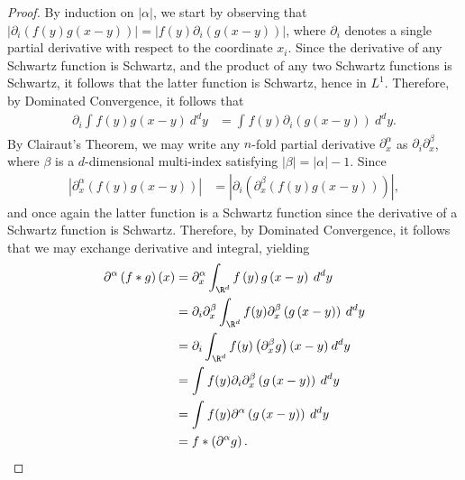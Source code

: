 \documentclass[10pt]{mypackage}
\begin{document}
\begin{proof}
  By induction on $\left\vert \alpha \right\vert$, we start by observing that $\left\vert \partial_{i}\left( f(y)g\left( x-y \right) \right) \right\vert = \left\vert f(y)\partial_{i}\left( g\left( x-y \right) \right) \right\vert$, where $\partial_i$ denotes a single partial derivative with respect to the coordinate $x_i$. Since the derivative of any Schwartz function is Schwartz, and the product of any two Schwartz functions is Schwartz, it follows that the latter function is Schwartz, hence in $L^1$. Therefore, by Dominated Convergence, it follows that
  \begin{align*}
    \partial_{i} \int_{}^{} f\left( y \right)g\left( x-y \right)\:d^{d}y &= \int_{}^{} f(y)\partial_{i}\left( g\left( x-y \right) \right)\:d^{d}y.
  \end{align*}
  By Clairaut's Theorem, we may write any $n$-fold partial derivative $\partial^{\alpha}_x$ as $\partial_{i}\partial^{\beta}_x$, where $\beta$ is a $d$-dimensional multi-index satisfying $\left\vert \beta \right\vert = \left\vert \alpha \right\vert-1$. Since
  \begin{align*}
    \left\vert \partial^{\alpha}_x\left( f(y)g\left( x-y \right) \right) \right\vert &= \left\vert \partial_i\left( \partial^{\beta}_x\left( f(y)g\left( x-y \right) \right) \right) \right\vert,
  \end{align*}
  and once again the latter function is a Schwartz function since the derivative of a Schwartz function is Schwartz. Therefore, by Dominated Convergence, it follows that we may exchange derivative and integral, yielding
  \begin{align*}
    \partial^{\alpha}\left( f\ast g \right)\left( x \right) &= \partial^{\alpha}_{x} \int_{\R^d}^{} f\left( y \right)g\left( x-y \right)\:d^{d}y\\
                                          &= \partial_i\partial^{\beta}_x\int_{\R^d}^{} f(y)\partial^{\beta}_x\left( g\left( x-y \right) \right)\:d^{d}y\\
                                          &= \partial_i\int_{\R^d}^{} f(y)\left( \partial^{\beta}_xg \right)(x-y)\:d^{d}y\\
                                          &= \int_{}^{} f(y)\partial_i\partial^{\beta}_x\left( g\left( x-y \right) \right)\:d^{d}y\\
                                          &= \int_{}^{} f(y)\partial^{\alpha}\left( g\left( x-y \right) \right)\:d^{d}y\\
                                          &= f\ast \left( \partial^{\alpha}g \right).
  \end{align*}
\end{proof}
\end{document}
